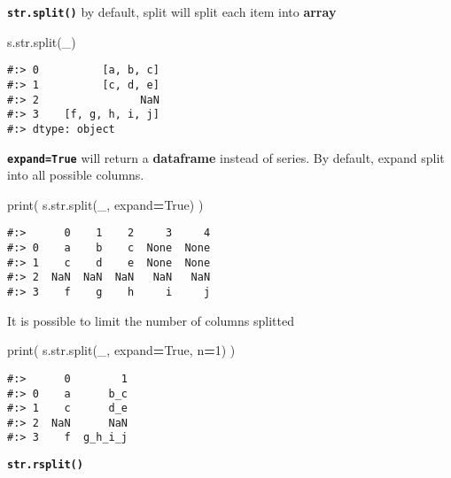 \documentclass[
]{book}
\newenvironment{Shaded}{\begin{snugshade}}{\end{snugshade}}
\newcommand{\BuiltInTok}[1]{#1}
\newcommand{\DecValTok}[1]{\textcolor[rgb]{0.06,0.06,0.06}{#1}}
\newcommand{\NormalTok}[1]{#1}
\newcommand{\OperatorTok}[1]{\textcolor[rgb]{0.43,0.43,0.43}{\textbf{#1}}}
\newcommand{\StringTok}[1]{\textcolor[rgb]{0.5,0.5,0.5}{#1}}
\newcommand{\VariableTok}[1]{\textcolor[rgb]{0,0,0}{#1}}
\begin{document}
\textbf{\texttt{str.split()}} by default, split will split each item into \textbf{array}

\begin{Shaded}
\begin{Highlighting}[]
\NormalTok{s.}\BuiltInTok{str}\NormalTok{.split(}\StringTok{\textquotesingle{}\_\textquotesingle{}}\NormalTok{)}
\end{Highlighting}
\end{Shaded}

\begin{verbatim}
#:> 0          [a, b, c]
#:> 1          [c, d, e]
#:> 2                NaN
#:> 3    [f, g, h, i, j]
#:> dtype: object
\end{verbatim}

\textbf{\texttt{expand=True}} will return a \textbf{dataframe} instead of series. By default, expand split into all possible columns.

\begin{Shaded}
\begin{Highlighting}[]
\BuiltInTok{print}\NormalTok{( s.}\BuiltInTok{str}\NormalTok{.split(}\StringTok{\textquotesingle{}\_\textquotesingle{}}\NormalTok{, expand}\OperatorTok{=}\VariableTok{True}\NormalTok{) )}
\end{Highlighting}
\end{Shaded}

\begin{verbatim}
#:>      0    1    2     3     4
#:> 0    a    b    c  None  None
#:> 1    c    d    e  None  None
#:> 2  NaN  NaN  NaN   NaN   NaN
#:> 3    f    g    h     i     j
\end{verbatim}

It is possible to limit the number of columns splitted

\begin{Shaded}
\begin{Highlighting}[]
\BuiltInTok{print}\NormalTok{( s.}\BuiltInTok{str}\NormalTok{.split(}\StringTok{\textquotesingle{}\_\textquotesingle{}}\NormalTok{, expand}\OperatorTok{=}\VariableTok{True}\NormalTok{, n}\OperatorTok{=}\DecValTok{1}\NormalTok{) )}
\end{Highlighting}
\end{Shaded}

\begin{verbatim}
#:>      0        1
#:> 0    a      b_c
#:> 1    c      d_e
#:> 2  NaN      NaN
#:> 3    f  g_h_i_j
\end{verbatim}

\textbf{\texttt{str.rsplit()}}
\end{document}
